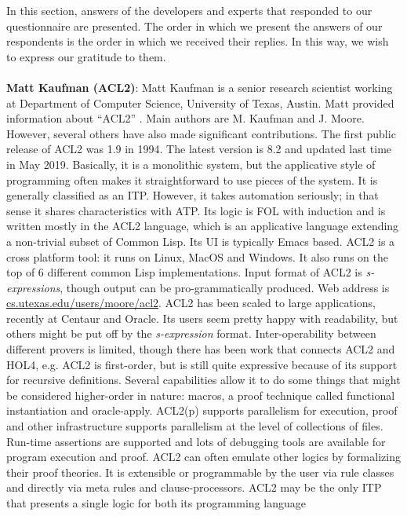 \label{s4}
In this section, answers of the developers and experts that responded to our questionnaire are presented. The order in which we present the
answers of our respondents is the order in which we received their replies. In this way, we wish to express our gratitude to them.
\\\\
{\bf Matt Kaufman (ACL2)}: Matt Kaufman is a senior research scientist working at Department of Computer Science, University of Texas, Austin. Matt provided information about 
``ACL2'' . Main authors are M. Kaufman and J. Moore. However, 
several others have also made significant contributions. The first public release of ACL2 was 1.9 in 1994. The latest version is 8.2 and updated last time in 
May 2019. Basically, it is a monolithic system, but the applicative style of programming often makes it 
straightforward to use pieces of the system. It is generally classified as an ITP. However, it takes automation seriously; in that sense it 
shares characteristics with ATP. Its logic is FOL with induction and is written mostly in the ACL2 language, which is 
an applicative language extending a non-trivial subset of Common Lisp. Its UI is typically Emacs based. ACL2 is a cross
platform tool: it runs on Linux, MacOS and Windows. It also runs on the top of 6 different common Lisp implementations. Input format of ACL2 is 
{\em s-expressions}, though output can be pro-grammatically produced. Web address is \url{cs.utexas.edu/users/moore/acl2}.
ACL2 has been scaled to large applications, recently at Centaur and Oracle. Its users seem pretty happy with readability, but others might be 
put off by the \emph{s-expression} format. Inter-operability between different provers is limited, though there has been work 
 that connects ACL2 and HOL4, e.g. ACL2 is first-order, but is still quite expressive because of its support for 
recursive definitions. Several capabilities allow it to do some things that might be considered higher-order in nature: macros, a proof technique 
called functional instantiation and oracle-apply. ACL2(p)  supports parallelism for execution, proof and other infrastructure supports parallelism at the
level of collections of files. Run-time assertions are supported and lots of debugging tools are available for program execution and proof.
ACL2 can often emulate other logics by formalizing their proof theories. It is extensible or programmable by the user via rule classes and 
directly via meta rules and clause-processors. ACL2 may be the only ITP that presents a single logic for both its programming language  
